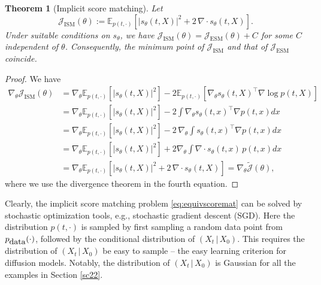 \documentclass[letterpaper,11pt,reqno]{amsart}
\newtheorem{theorem}{Theorem}[section]
\numberwithin{equation}{section}
\begin{document}
\begin{theorem}[Implicit score matching]
\cite{Hyv05}
\label{thm:scoremat}
Let 
\begin{equation}
\label{eq:equivscoremat}
\mathcal{J}_{\text{ISM}}(\theta):= \mathbb{E}_{p(t, \cdot)} \left[ |s_\theta(t,X)|^2  + 2 \, \nabla \cdot s_\theta (t,X)\right].
\end{equation}
Under suitable conditions on $s_\theta$, we have 
$\mathcal{J}_{\text{ISM}}(\theta) = \mathcal{J}_{\text{ESM}}(\theta) + C$ for some $C$ independent of $\theta$. 
Consequently, the minimum point of $\mathcal{J}_{\text{ISM}}$ and that of $\mathcal{J}_{\text{ESM}}$ coincide. 
\end{theorem}
\begin{proof}
We have 
\begin{equation*}
\begin{aligned}
\nabla_\theta \mathcal{J}_{\text{ISM}}(\theta) 
& = \nabla_\theta \mathbb{E}_{p(t, \cdot)} \left[|s_\theta(t,X)|^2\right] - 2 \mathbb{E}_{p(t, \cdot)} \left[\nabla_\theta s_\theta(t,X)^\top \nabla \log p(t,X)\right] \\
& =  \nabla_\theta \mathbb{E}_{p(t, \cdot)} \left[|s_\theta(t,X)|^2\right]  - 2 \int \nabla_\theta s_\theta(t,x)^\top \nabla p(t,x) dx \\
& =\nabla_\theta \mathbb{E}_{p(t, \cdot)} \left[|s_\theta(t,X)|^2\right]  - 2 \, \nabla_\theta \int  s_\theta(t,x)^\top \nabla p(t,x) dx  \\ 
& = \nabla_\theta \mathbb{E}_{p(t, \cdot)} \left[|s_\theta(t,X)|^2\right] + 2 \nabla_\theta \int \nabla \cdot s_\theta(t,x) \, p(t,x) dx \\
& = \nabla_\theta \mathbb{E}_{p(t, \cdot)}\left[|s_\theta(t,X)|^2 + 2\, \nabla \cdot s_\theta(t,X) \right] = \nabla_\theta \widetilde{\mathcal{J}}(\theta),
\end{aligned}
\end{equation*}
where we use the divergence theorem in the fourth equation. 
\end{proof}

\quad Clearly, the implicit score matching problem \eqref{eq:equivscoremat} can be solved by stochastic optimization tools,
e.g., stochastic gradient descent (SGD). 
Here the distribution $p(t, \cdot)$ is sampled by
first sampling a random data point from $p_{\tiny \mbox{data}}(\cdot)$,
followed by the conditional distribution of $(X_t \,|\, X_0)$.
This requires
the distribution of $(X_t \,|\,X_0)$ be easy to sample
-- the easy learning criterion for diffusion models.
Notably,
the distribution of $(X_t \,|\, X_0)$
is Gaussian for all the examples in Section \ref{sc22}.
\end{document}

